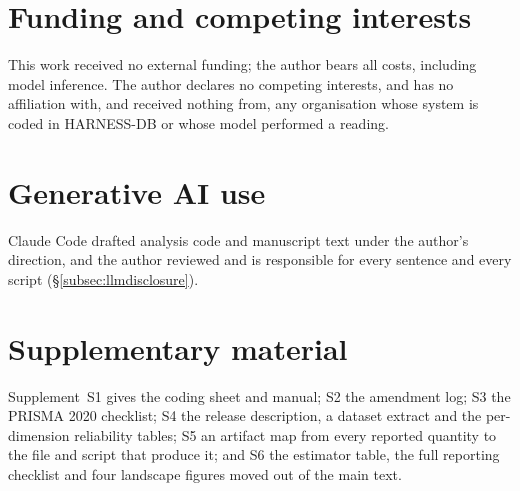\documentclass{article}
\begin{document}
\section*{Funding and competing interests}
This work received no external funding; the author bears all costs, including model inference. The
author declares no competing interests, and has no affiliation with, and received nothing from, any
organisation whose system is coded in HARNESS-DB or whose model performed a reading.

\section*{Generative AI use}
Claude Code drafted analysis code and manuscript text under the author's direction, and the author
reviewed and is responsible for every sentence and every script (\S\ref{subsec:llmdisclosure}).

\section*{Supplementary material}
Supplement~S1 gives the coding sheet and manual; S2 the amendment log; S3 the PRISMA 2020 checklist;
S4 the release description, a dataset extract and the per-dimension reliability tables; S5 an artifact
map from every reported quantity to the file and script that produce it; and S6 the estimator table,
the full reporting checklist and four landscape figures moved out of the main text.



\end{document}
